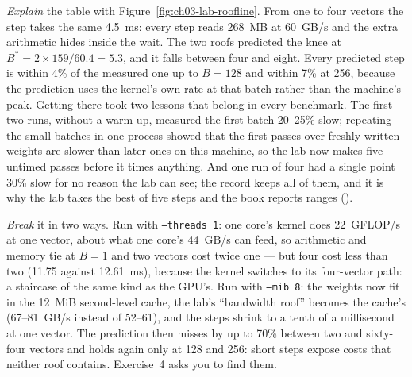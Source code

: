 \emph{Explain} the table with Figure~\ref{fig:ch03-lab-roofline}. From one to
four vectors the step takes the same 4.5~ms: every step reads 268~MB at
60~GB/s and the extra arithmetic hides inside the wait. The two roofs predicted
the knee at $B^{*} = 2 \times 159/60.4 = 5.3$, and it falls between four and
eight. Every predicted step is within 4\% of the measured one up to $B = 128$
and within 7\% at 256, because the prediction uses the kernel's own rate at that
batch rather than the machine's peak. Getting there took two lessons that
belong in every benchmark. The first two runs, without a warm-up, measured the
first batch 20--25\% slow; repeating the small batches in one process showed
that the first passes over freshly written weights are slower than later ones on
this machine, so the lab now makes five untimed passes before it times anything.
And one run of four had a single point 30\% slow for no reason the lab can see;
the record keeps all of them, and it is why the lab takes the best of five
steps and the book reports ranges ().

\emph{Break} it in two ways. Run with \texttt{--threads 1}: one core's kernel
does 22~GFLOP/s at one vector, about what one core's 44~GB/s can feed, so
arithmetic and memory tie at $B = 1$ and two vectors cost twice one --- but four
cost less than two (11.75 against 12.61~ms), because the kernel switches to its
four-vector path: a staircase of the same kind as the GPU's. Run with
\texttt{--mib 8}: the weights now fit in the 12~MiB second-level cache, the
lab's ``bandwidth roof'' becomes the cache's (67--81~GB/s instead of 52--61), and
the steps shrink to a tenth of a millisecond at one vector. The prediction then
misses by up to 70\% between two and sixty-four vectors and holds again only at
128 and 256: short steps expose costs that neither roof contains. Exercise~4
asks you to find them.


